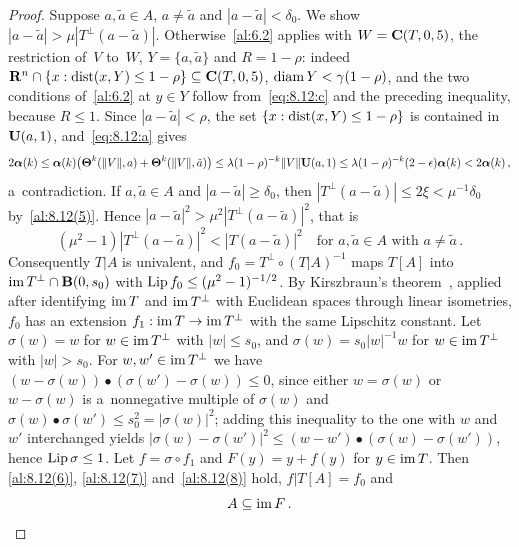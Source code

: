 \begin{proof}
    Suppose $a, \tilde a \in A$, $a \ne \tilde a$ and $|a - \tilde a| < \delta_0$. We show $|a -
    \tilde a| > \mu |T^\perp(a - \tilde a)|$. Otherwise~\ref{al:6.2} applies with $W =
    \mathbf{C} ( T, 0, 5 )$, the restriction of~$V$ to~$W$, $Y = \{ a, \tilde a \}$ and $R = 1 - \rho$:
    indeed $\mathbf{R}^{n} \cap \{ x : \operatorname{dist}(x,Y) \le 1 - \rho \} \subseteq \mathbf{C} ( T, 0, 5 )$, $\operatorname{diam} Y
    < \gamma (1 - \rho)$, and the two conditions of~\ref{al:6.2} at $y \in Y$ follow
    from~\eqref{eq:8.12:c} and the preceding inequality, because $R \le 1$. Since $|a - \tilde a| <
    \rho$, the set $\{ x : \operatorname{dist}(x,Y) \le 1 - \rho \}$ is contained in $\mathbf{U}(a,1)$,
    and~\eqref{eq:8.12:a} gives
    \begin{displaymath}
        2 \boldsymbol{\alpha}(k) \le \boldsymbol{\alpha}(k) \big( \boldsymbol{\Theta}^{k}(\|V\|,a) +
        \boldsymbol{\Theta}^{k}(\|V\|,\tilde a) \big) \le \lambda (1 - \rho)^{-k} \|V\| \mathbf{U}(a,1) \le
        \lambda (1 - \rho)^{-k} (2 - \epsilon) \boldsymbol{\alpha}(k) < 2 \boldsymbol{\alpha}(k) \,,
    \end{displaymath}
    a~contradiction. If $a, \tilde a \in A$ and $|a - \tilde a| \ge \delta_0$, then $|T^\perp(a -
    \tilde a)| \le 2 \xi < \mu^{-1} \delta_0$ by~\ref{al:8.12(5)}. Hence $|a - \tilde a|^2 > \mu^2
    |T^\perp(a - \tilde a)|^2$, that is
    \begin{displaymath}
        (\mu^2 - 1) |T^\perp(a - \tilde a)|^2 < |T(a - \tilde a)|^2 \quad \text{for $a, \tilde a \in
        A$ with $a \ne \tilde a$} \,.
    \end{displaymath}
    Consequently $T|A$ is univalent, and $f_0 = T^\perp \circ (T|A)^{-1}$ maps $T[A]$ into $\operatorname{im}
    T^\perp \cap \mathbf{B}(0,s_0)$ with $\operatorname{Lip} f_0 \le (\mu^2 - 1)^{-1/2}$. By Kirszbraun's
    theorem~\cite[2.10.43]{Federer1969}, applied after identifying $\operatorname{im} T$ and $\operatorname{im} T^\perp$ with
    Euclidean spaces through linear isometries, $f_0$ has an extension $f_1 : \operatorname{im} T \to \operatorname{im} T^\perp$
    with the same Lipschitz constant. Let $\sigma(w) = w$ for $w \in \operatorname{im} T^\perp$ with $|w| \le
    s_0$, and $\sigma(w) = s_0 |w|^{-1} w$ for $w \in \operatorname{im} T^\perp$ with $|w| > s_0$. For $w, w' \in
    \operatorname{im} T^\perp$ we have $(w - \sigma(w)) \bullet (\sigma(w') - \sigma(w)) \le 0$, since either $w =
    \sigma(w)$ or $w - \sigma(w)$ is a~nonnegative multiple of $\sigma(w)$ and $\sigma(w) \bullet
    \sigma(w') \le s_0^2 = |\sigma(w)|^2$; adding this inequality to the one with $w$ and~$w'$
    interchanged yields $|\sigma(w) - \sigma(w')|^2 \le (w - w') \bullet (\sigma(w) - \sigma(w'))$,
    hence $\operatorname{Lip} \sigma \le 1$. Let $f = \sigma \circ f_1$ and $F(y) = y + f(y)$ for $y \in \operatorname{im} T$.
    Then \ref{al:8.12(6)}, \ref{al:8.12(7)} and~\ref{al:8.12(8)} hold, $f | T[A] = f_0$ and
    \begin{equation}
        \label{eq:8.12:10}
        A \subseteq \operatorname{im} F \,.
    \end{equation}


\end{proof}
